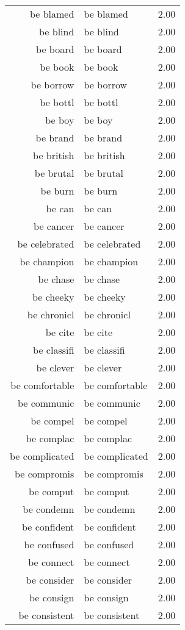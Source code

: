 \begin{table}[ht]
\begin{tabular}{rlr}
  be blamed & be blamed & 2.00 \\ 
  be blind & be blind & 2.00 \\ 
  be board & be board & 2.00 \\ 
  be book & be book & 2.00 \\ 
  be borrow & be borrow & 2.00 \\ 
  be bottl & be bottl & 2.00 \\ 
  be boy & be boy & 2.00 \\ 
  be brand & be brand & 2.00 \\ 
  be british & be british & 2.00 \\ 
  be brutal & be brutal & 2.00 \\ 
  be burn & be burn & 2.00 \\ 
  be can & be can & 2.00 \\ 
  be cancer & be cancer & 2.00 \\ 
  be celebrated & be celebrated & 2.00 \\ 
  be champion & be champion & 2.00 \\ 
  be chase & be chase & 2.00 \\ 
  be cheeky & be cheeky & 2.00 \\ 
  be chronicl & be chronicl & 2.00 \\ 
  be cite & be cite & 2.00 \\ 
  be classifi & be classifi & 2.00 \\ 
  be clever & be clever & 2.00 \\ 
  be comfortable & be comfortable & 2.00 \\ 
  be communic & be communic & 2.00 \\ 
  be compel & be compel & 2.00 \\ 
  be complac & be complac & 2.00 \\ 
  be complicated & be complicated & 2.00 \\ 
  be compromis & be compromis & 2.00 \\ 
  be comput & be comput & 2.00 \\ 
  be condemn & be condemn & 2.00 \\ 
  be confident & be confident & 2.00 \\ 
  be confused & be confused & 2.00 \\ 
  be connect & be connect & 2.00 \\ 
  be consider & be consider & 2.00 \\ 
  be consign & be consign & 2.00 \\ 
  be consistent & be consistent & 2.00 \\ 

\end{tabular}
\end{table}
